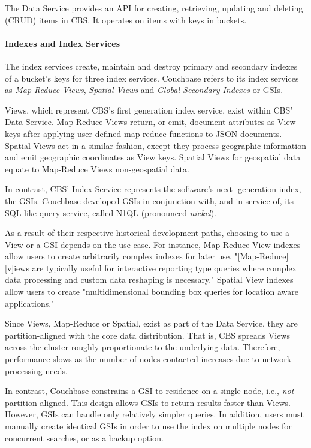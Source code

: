 \documentclass[9pt,twocolumn,twoside]{styles/osajnl}
\begin{document}
The Data Service provides an API for creating,
retrieving, updating and deleting (CRUD) items in CBS.  It operates on items
with keys in buckets.\cite{www-architecture-cbsinc}

\paragraph{Indexes and Index Services} The index services create, maintain
and destroy primary and secondary indexes of a bucket's keys for three index
services.  Couchbase refers to its index services as \textit{Map-Reduce Views},
\textit{Spatial Views} and \textit{Global Secondary Indexes} or GSIs.  

Views, which represent CBS's first generation index service, exist within CBS'
Data Service.  Map-Reduce Views return, or emit, document attributes as View
keys after applying user-defined map-reduce functions to JSON documents. Spatial
Views act in a similar fashion, except they process geographic information and
emit geographic coordinates as View keys.\cite{www-queries-cbsinc}  Spatial
Views for geospatial data equate to Map-Reduce Views non-geospatial data.

In contrast, CBS' Index Service represents the software's next-
generation index, the GSIs.  Couchbase developed GSIs in conjunction with, and
in service of, its SQL-like query service, called N1QL (pronounced
\textit{nickel}).

As a result of their respective historical development paths, choosing to use a
View or a GSI depends on the use case. For instance, Map-Reduce View indexes
allow users to create arbitrarily complex indexes for later use.  "[Map-Reduce]
[v]iews are typically useful for interactive reporting type queries where
complex data processing and custom data reshaping is necessary."  Spatial View indexes allow users to create "multidimensional bounding box queries for location aware applications." \cite{www-viewsindexing-cbsinc}

Since Views, Map-Reduce or Spatial, exist as part of the Data Service, they are
partition-aligned with the core data distribution.  That is, CBS spreads Views
across the cluster roughly proportionate to the underlying data.  Therefore,
performance slows as the number of nodes contacted increases due to network
processing needs.

In contrast, Couchbase constrains a GSI to residence on a single node, i.e.,
\textit{not} partition-aligned.  This design allows GSIs to return results
faster than Views.  However, GSIs can handle only relatively simpler queries.
In addition, users must manually create identical GSIs in order to use
the index on multiple nodes for concurrent searches, or as a backup option.
\end{document}

